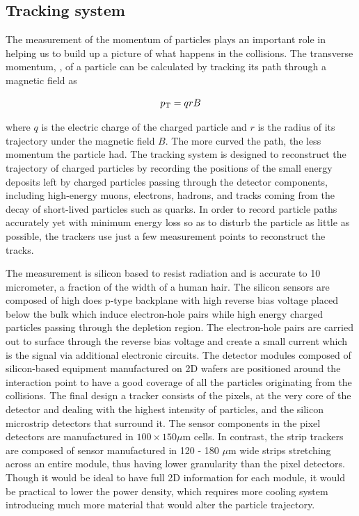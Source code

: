 \subsection{Tracking system}
The measurement of the momentum of particles plays an important role in helping us to build up a picture of what happens in the collisions.
The transverse momentum, \PT, of a particle can be calculated by tracking its path through a magnetic field as
\begin{linenomath}\begin{equation}\label{eq:cms_momentum}
    p_{\mathrm{T}} = qrB
\end{equation}\end{linenomath}
where $q$ is the electric charge of the charged particle and $r$ is the radius of its trajectory under the magnetic field $B$.
The more curved the path, the less momentum the particle had.
The tracking system is designed to reconstruct the trajectory of charged particles by recording the positions of the small energy deposits left by charged particles passing through the detector components, including high-energy muons, electrons, hadrons, and tracks coming from the decay of short-lived particles such as \PQb quarks.
In order to record particle paths accurately yet with minimum energy loss so as to disturb the particle as little as possible, the trackers use just a few measurement points to reconstruct the tracks.

The measurement is silicon based to resist radiation and is accurate to 10 micrometer, a fraction of the width of a human hair.
The silicon sensors are composed of high does p-type backplane with high reverse bias voltage placed below the bulk which induce electron-hole pairs while high energy charged particles passing through the depletion region.
The electron-hole pairs are carried out to surface through the reverse bias voltage and create a small current which is the signal via additional electronic circuits.
The detector modules composed of silicon-based equipment manufactured on 2D wafers are positioned around the interaction point to have a good coverage of all the particles originating from the collisions.
The final design a tracker consists of the pixels, at the very core of the detector and dealing with the highest intensity of particles, and the silicon microstrip detectors that surround it.
The sensor components in the pixel detectors are manufactured in $100 \times 150 \mu$m cells.
In contrast, the strip trackers are composed of sensor manufactured in 120 - 180 $\mu$m wide strips stretching across an entire module, thus having lower granularity than the pixel detectors.
Though it would be ideal to have full 2D information for each module, it would be practical to lower the power density, which requires more cooling system introducing much more material that would alter the particle trajectory.

